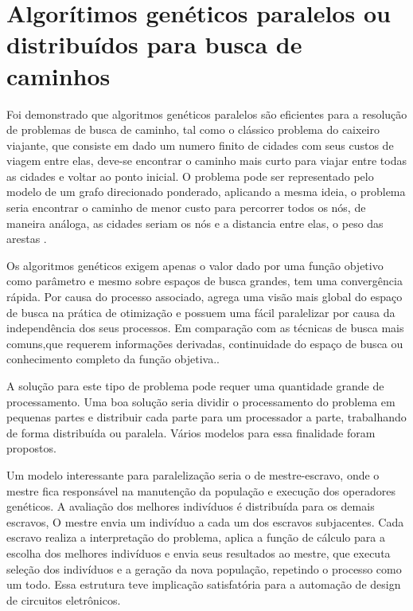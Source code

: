 \section{Algorítimos genéticos paralelos ou distribuídos para busca de caminhos}

Foi demonstrado que algoritmos genéticos paralelos são eficientes para a resolução de problemas de busca de caminho, tal como o clássico problema do caixeiro viajante, que consiste em dado um numero finito de cidades com seus custos de viagem entre elas, deve-se encontrar o caminho mais curto para viajar entre todas as cidades e voltar ao ponto inicial. O problema pode ser representado pelo modelo de um grafo direcionado ponderado, aplicando a mesma ideia, o problema seria encontrar o caminho de menor custo para percorrer todos os nós, de maneira análoga, as cidades seriam os nós e a distancia entre elas, o peso das arestas \cite{Jason}\cite{Alaoui}\cite{Heinz}.

Os algoritmos genéticos exigem apenas o valor dado por uma função objetivo como parâmetro e mesmo sobre espaços de busca grandes, tem uma convergência rápida. Por causa do processo associado, agrega uma visão mais global do espaço de busca na prática de otimização e possuem uma fácil paralelizar por causa da independência dos seus processos. Em comparação com as técnicas de busca mais comuns,que requerem informações derivadas, continuidade do espaço de busca ou conhecimento completo da função objetiva.\cite{Vilson}.

A solução para este tipo de problema pode requer uma quantidade grande de processamento. Uma boa solução seria dividir o processamento do problema em pequenas partes e distribuir cada parte para um processador a parte, trabalhando de forma distribuída ou paralela. Vários modelos para essa finalidade foram propostos.

Um modelo interessante para paralelização seria o de mestre-escravo, onde o mestre fica responsável na manutenção da população e execução dos operadores genéticos. A avaliação dos melhores indivíduos é distribuída para os demais escravos, O mestre envia um indivíduo a cada um dos escravos subjacentes. Cada escravo realiza a interpretação do problema, aplica a função de cálculo para a escolha dos melhores indivíduos e envia seus resultados ao mestre, que executa seleção dos indivíduos e a geração da nova população, repetindo o processo como um todo. Essa estrutura teve implicação satisfatória para a automação de design de circuitos eletrônicos. \cite{Jason}

